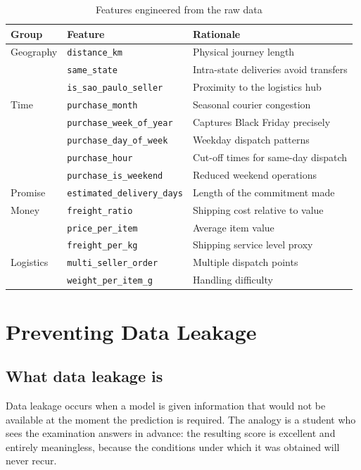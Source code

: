 \documentclass[11pt,a4paper]{report}
\begin{document}
\begin{table}[H]
\centering
\caption{Features engineered from the raw data}
\begin{tabular}{@{}lll@{}}
\toprule
\textbf{Group} & \textbf{Feature} & \textbf{Rationale} \\
\midrule
Geography & \texttt{distance\_km} & Physical journey length \\
 & \texttt{same\_state} & Intra-state deliveries avoid transfers \\
 & \texttt{is\_sao\_paulo\_seller} & Proximity to the logistics hub \\
\midrule
Time & \texttt{purchase\_month} & Seasonal courier congestion \\
 & \texttt{purchase\_week\_of\_year} & Captures Black Friday precisely \\
 & \texttt{purchase\_day\_of\_week} & Weekday dispatch patterns \\
 & \texttt{purchase\_hour} & Cut-off times for same-day dispatch \\
 & \texttt{purchase\_is\_weekend} & Reduced weekend operations \\
\midrule
Promise & \texttt{estimated\_delivery\_days} & Length of the commitment made \\
\midrule
Money & \texttt{freight\_ratio} & Shipping cost relative to value \\
 & \texttt{price\_per\_item} & Average item value \\
 & \texttt{freight\_per\_kg} & Shipping service level proxy \\
\midrule
Logistics & \texttt{multi\_seller\_order} & Multiple dispatch points \\
 & \texttt{weight\_per\_item\_g} & Handling difficulty \\
\bottomrule
\end{tabular}
\end{table}

\section{Preventing Data Leakage}

\subsection{What data leakage is}

Data leakage occurs when a model is given information that would not be
available at the moment the prediction is required. The analogy is a student who
sees the examination answers in advance: the resulting score is excellent and
entirely meaningless, because the conditions under which it was obtained will
never recur.
\end{document}
